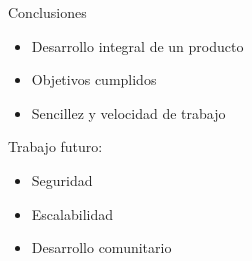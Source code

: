 \documentclass[xcolor=dvipsnames, 14pt]{beamer}
\begin{document}
\begin{frame}{Conclusiones}
\begin{itemize}
    \item Desarrollo integral de un producto
    \item Objetivos cumplidos
    \item Sencillez y velocidad de trabajo
\end{itemize}
\pause

Trabajo futuro:
\begin{itemize}
    \item Seguridad
    \item Escalabilidad
    \item Desarrollo comunitario
\end{itemize}


\end{frame}
\end{document}
